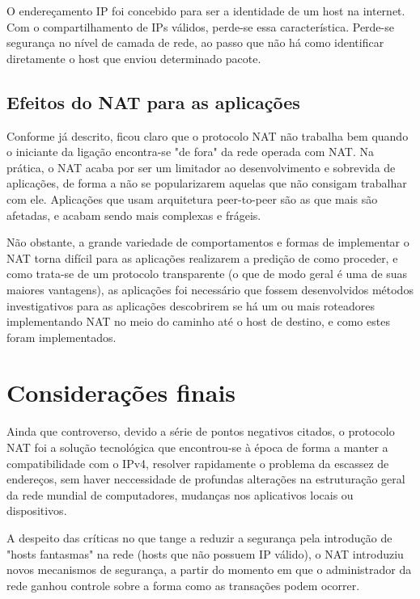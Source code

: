 \documentclass[
	12pt,				%
	oneside,			%
	a4paper,			%
	english,			%
	brazil,				%
	]{ime-abntex2}
\begin{document}
O endereçamento IP foi concebido para ser a identidade de um host na internet. Com o
compartilhamento de IPs válidos, perde-se essa característica. Perde-se segurança no nível
de camada de rede, ao passo que não há como identificar diretamente o host que enviou
determinado pacote.

\subsection{Efeitos do NAT para as aplicações}

Conforme já descrito, ficou claro que o protocolo NAT não trabalha bem quando o iniciante
da ligação encontra-se "de fora" da rede operada com NAT. Na prática, o NAT acaba por ser
um limitador ao desenvolvimento e sobrevida de aplicações, de forma a não se popularizarem aquelas
que não consigam trabalhar com ele. Aplicações que usam arquitetura peer-to-peer são as que mais
são afetadas, e acabam sendo mais complexas e frágeis.

Não obstante, a grande variedade de comportamentos e formas de implementar o NAT torna difícil
para as aplicações realizarem a predição de como proceder, e como trata-se de um protocolo
transparente (o que de modo geral é uma de suas maiores vantagens), as aplicações foi necessário
que fossem desenvolvidos métodos investigativos para as aplicações descobrirem se há um ou mais
roteadores implementando NAT no meio do caminho até o host de destino, e como estes foram implementados.

\section{Considerações finais}

Ainda que controverso, devido a série de pontos negativos citados, o protocolo NAT foi a
solução tecnológica que encontrou-se à época de forma a manter a compatibilidade com o IPv4, resolver
rapidamente o problema da escassez de endereços, sem haver neccessidade de profundas alterações
na estruturação geral da rede mundial de computadores, mudanças nos aplicativos locais ou dispositivos.

A despeito das críticas no que tange a reduzir a segurança pela introdução de "hosts fantasmas"
na rede (hosts que não possuem IP válido), o NAT introduziu novos mecanismos de segurança, a partir do
momento em que o administrador da rede ganhou controle sobre a forma como as transações podem ocorrer.

%

\postextual


%
\end{document}
